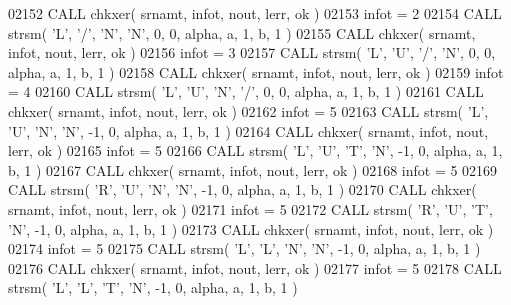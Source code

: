 \begin{DoxyCode}
02152       \textcolor{keyword}{CALL }chkxer( srnamt, infot, nout, lerr, ok )
02153       infot = 2
02154       \textcolor{keyword}{CALL }strsm( \textcolor{stringliteral}{'L'}, \textcolor{stringliteral}{'/'}, \textcolor{stringliteral}{'N'}, \textcolor{stringliteral}{'N'}, 0, 0, alpha, a, 1, b, 1 )
02155       \textcolor{keyword}{CALL }chkxer( srnamt, infot, nout, lerr, ok )
02156       infot = 3
02157       \textcolor{keyword}{CALL }strsm( \textcolor{stringliteral}{'L'}, \textcolor{stringliteral}{'U'}, \textcolor{stringliteral}{'/'}, \textcolor{stringliteral}{'N'}, 0, 0, alpha, a, 1, b, 1 )
02158       \textcolor{keyword}{CALL }chkxer( srnamt, infot, nout, lerr, ok )
02159       infot = 4
02160       \textcolor{keyword}{CALL }strsm( \textcolor{stringliteral}{'L'}, \textcolor{stringliteral}{'U'}, \textcolor{stringliteral}{'N'}, \textcolor{stringliteral}{'/'}, 0, 0, alpha, a, 1, b, 1 )
02161       \textcolor{keyword}{CALL }chkxer( srnamt, infot, nout, lerr, ok )
02162       infot = 5
02163       \textcolor{keyword}{CALL }strsm( \textcolor{stringliteral}{'L'}, \textcolor{stringliteral}{'U'}, \textcolor{stringliteral}{'N'}, \textcolor{stringliteral}{'N'}, -1, 0, alpha, a, 1, b, 1 )
02164       \textcolor{keyword}{CALL }chkxer( srnamt, infot, nout, lerr, ok )
02165       infot = 5
02166       \textcolor{keyword}{CALL }strsm( \textcolor{stringliteral}{'L'}, \textcolor{stringliteral}{'U'}, \textcolor{stringliteral}{'T'}, \textcolor{stringliteral}{'N'}, -1, 0, alpha, a, 1, b, 1 )
02167       \textcolor{keyword}{CALL }chkxer( srnamt, infot, nout, lerr, ok )
02168       infot = 5
02169       \textcolor{keyword}{CALL }strsm( \textcolor{stringliteral}{'R'}, \textcolor{stringliteral}{'U'}, \textcolor{stringliteral}{'N'}, \textcolor{stringliteral}{'N'}, -1, 0, alpha, a, 1, b, 1 )
02170       \textcolor{keyword}{CALL }chkxer( srnamt, infot, nout, lerr, ok )
02171       infot = 5
02172       \textcolor{keyword}{CALL }strsm( \textcolor{stringliteral}{'R'}, \textcolor{stringliteral}{'U'}, \textcolor{stringliteral}{'T'}, \textcolor{stringliteral}{'N'}, -1, 0, alpha, a, 1, b, 1 )
02173       \textcolor{keyword}{CALL }chkxer( srnamt, infot, nout, lerr, ok )
02174       infot = 5
02175       \textcolor{keyword}{CALL }strsm( \textcolor{stringliteral}{'L'}, \textcolor{stringliteral}{'L'}, \textcolor{stringliteral}{'N'}, \textcolor{stringliteral}{'N'}, -1, 0, alpha, a, 1, b, 1 )
02176       \textcolor{keyword}{CALL }chkxer( srnamt, infot, nout, lerr, ok )
02177       infot = 5
02178       \textcolor{keyword}{CALL }strsm( \textcolor{stringliteral}{'L'}, \textcolor{stringliteral}{'L'}, \textcolor{stringliteral}{'T'}, \textcolor{stringliteral}{'N'}, -1, 0, alpha, a, 1, b, 1 )

\end{DoxyCode}
